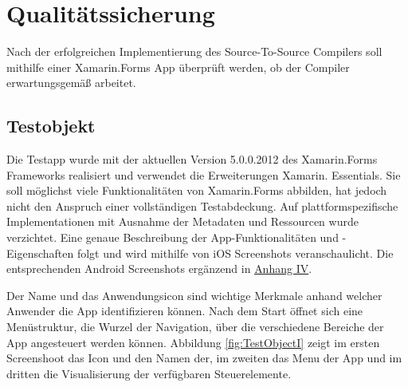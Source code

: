 \chapter{Qualitätssicherung}
\label{chap:Qualitätssicherung}

Nach der erfolgreichen Implementierung des Source-To-Source Compilers soll mithilfe einer Xamarin.Forms App überprüft werden,  ob der Compiler erwartungsgemäß arbeitet.  

\section{Testobjekt}
Die Testapp wurde mit der aktuellen Version 5.0.0.2012 des Xamarin.Forms Frameworks realisiert und verwendet die Erweiterungen Xamarin. Essentials.  Sie soll möglichst viele Funktionalitäten von Xamarin.Forms abbilden, hat jedoch nicht den Anspruch einer vollständigen Testabdeckung.
Auf plattformspezifische Implementationen mit Ausnahme der Metadaten und Ressourcen wurde verzichtet.  Eine genaue Beschreibung der App-Funktionalitäten und -Eigenschaften folgt und wird mithilfe von iOS Screenshots veranschaulicht.  Die entsprechenden Android Screenshots ergänzend in          \hyperref[chap:AnhangAndroidScreenshots]{Anhang IV}.

Der Name und das Anwendungsicon sind wichtige Merkmale anhand welcher Anwender die App identifizieren können.  Nach dem Start öffnet sich eine Menüstruktur, die Wurzel der Navigation, über die verschiedene 
Bereiche der App angesteuert werden können.  Abbildung \ref{fig:TestObjectI} zeigt im ersten Screenshoot das Icon und den Namen der,  im zweiten das Menu der App und im dritten die Visualisierung der verfügbaren Steuerelemente.

